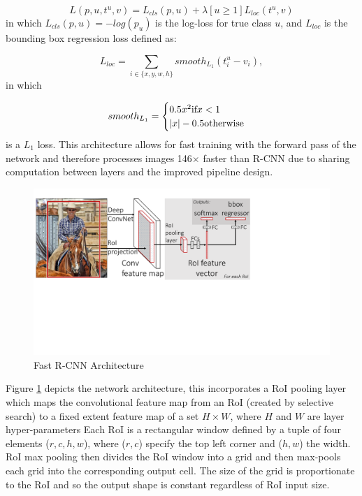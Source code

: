 \documentclass[11pt,twoside]{report}
\begin{document}
\begin{equation}
\label{multi-task_loss}
L(p,u,t^{u},v) = L_{cls}(p,u) + \lambda[u \geq 1]L_{loc}(t^{u},v)
\end{equation}
in which $L_{cls}(p,u) = -log(p_{u})$ is the log-loss for true class $u$, and $L_{loc}$ is the bounding box regression loss defined as:

\begin{equation}
\label{bbox_loss}
L_{loc} = \sum_{i\in \{x,y,w,h\}}smooth_{L_{1}}(t^{u}_{i}-v_{i}),
\end{equation}
in which

\begin{equation}
\label{multi-task_s}
smooth_{L_{1}} = 
\begin{cases}
0.5x^{2} \textnormal{if} x < 1 \\
|x| - 0.5  \textnormal{otherwise} \\
\end{cases}
\end{equation}
is a $L_{1}$ loss. This architecture allows for fast training with the forward pass of the network and therefore processes images 146$\times$ faster than R-CNN due to sharing computation between layers and the improved pipeline design. 

\noindent \begin{figure}[h!]
	\includegraphics[trim={0 22em 22em 3em},clip,width = 1.0\hsize]{./figures/arch.pdf}
	\caption{Fast R-CNN Architecture \cite{DBLP:journals/corr/Girshick15}}
	\label{Fast_RNN_fig}
\end{figure}

Figure \ref{Fast_RNN_fig} depicts the network architecture, this incorporates a RoI pooling layer which maps the convolutional feature map from an RoI (created by selective search) to a fixed extent feature map of a set $H \times W$, where $H$ and $W$ are layer hyper-parameters Each RoI is a rectangular window defined by a tuple of four elements ($r,c,h,w$), where ($r,c$) specify the top left corner and ($h,w$) the width. RoI max pooling then divides the RoI window into a grid and then max-pools each grid into the corresponding output cell. The size of the grid is proportionate to the RoI and so the output shape is constant regardless of RoI input size. 
\end{document}
